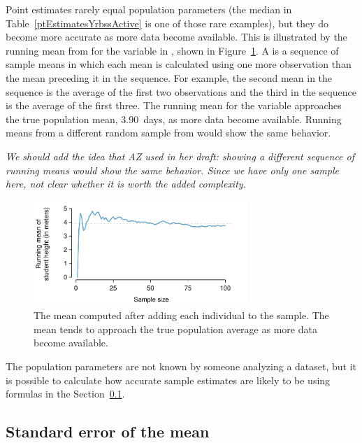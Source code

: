 \begin{spacing}{1.5}
Point estimates rarely equal population parameters (the median in Table~\ref{ptEstimatesYrbssActive} is one of those rare examples), but they do become more accurate as more data become available. This is illustrated by the running mean from for the variable  in , shown in Figure~\ref{yrbssActiveRunningMean}. A  is a sequence of sample means in which each mean is calculated using one more observation than the mean preceding it in the sequence. For example, the second mean in the sequence is the average of the first two observations and the third in the sequence is the average of the first three. The running mean for the  variable approaches the true population mean, 3.90~days, as more data become available.  Running means from a different random sample from  would show the same behavior.

\textit{We should add the idea that AZ used in her draft: showing a different sequence of running means would show the same behavior.  Since we have only one sample here, not clear whether it is worth the added complexity.}

\begin{figure}[h]
   \centering
   \includegraphics[width=0.72\textwidth]{ch_inference_foundations_oi_biostat/figures/yrbssActiveRunningMean/yrbssActiveRunningMean}
   \caption{The mean computed after adding each individual to the sample. The mean tends to approach the true population average as more data become available.}
   \label{yrbssActiveRunningMean}
\end{figure}


The population parameters are not known by someone analyzing a dataset, but it is possible to calculate how accurate sample estimates are likely to be using formulas in the Section~\ref{seOfTheMean}.


\subsection{Standard error of the mean}
\label{seOfTheMean}


\end{spacing}
